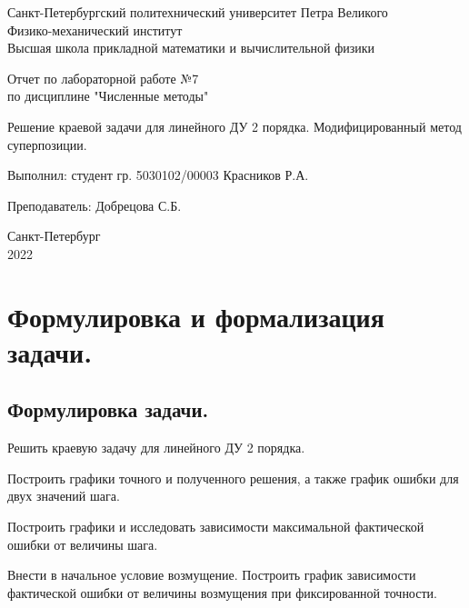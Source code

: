 \documentclass[a4paper, 12pt]{article}
\begin{document}
	\begin{titlepage}
		\begin{center}
			Санкт-Петербургский политехнический университет Петра Великого \\ Физико-механический институт \\ Высшая школа прикладной математики и вычислительной физики
		\end{center}
		\vspace{10em}
		\begin{center}
			\Large Отчет по лабораторной работе №7 \\ по дисциплине "Численные методы"
		\end{center}
		\vspace{1em}
		\begin{center}
			\Huge Решение краевой задачи для линейного ДУ 2 порядка. Модифицированный метод суперпозиции.
		\end{center}
		\vspace{15em}
		{\Large 
			
			Выполнил: студент гр. 5030102/00003 Красников Р.А.
			\vspace{1em}
			
			Преподаватель: Добрецова С.Б.}
		\vspace{\fill}
		\begin{center}
			Санкт-Петербург \\ 2022
		\end{center}
	\end{titlepage}
	\newpage
	
	\section{Формулировка и формализация задачи.}
	
	\subsection{Формулировка задачи.}
	
	Решить краевую задачу для линейного ДУ 2 порядка.
	
	Построить графики точного и полученного решения, а также график ошибки для двух значений шага.
	
	Построить графики и исследовать зависимости максимальной фактической ошибки от величины шага.
	
	Внести в начальное условие возмущение. Построить график зависимости фактической ошибки от величины возмущения при фиксированной точности.  
	
\end{document}
